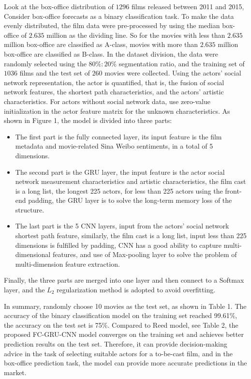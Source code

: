 \documentclass[review]{cvpr}
\begin{document}
Look at the box-office distribution of $1296$ films released between 2011 and 2015,
Consider box-office forecasts as a binary classification task.
To make the data evenly distributed, the film data were pre-processed by using the median box-office of $2.635$ million as the dividing line.
So for the movies with  less than $2.635$ million box-office are classified as A-class, movies with more than $2.635$ million box-office are classified as B-class.
In the dataset division, the data were randomly selected using the $80\%:20\%$ segmentation ratio, and the training set of $1036$ films and the test set of $260$ movies were collected.
Using the actors' social network representation, the actor is quantified, that is,
the fusion of social network features, the shortest path characteristics, and the actors' artistic characteristics.
For actors without social network data, use zero-value initialization in the actor feature matrix for the unknown characteristics.
As shown in Figure 1, the model is divided into three parts:

\begin{itemize}
\item The first part is the fully connected layer, its input feature is the film metadata and movie-related Sina Weibo sentiments, in a total of 5 dimensions.
\item The second part is the GRU layer, the input feature is the actor social network measurement characteristics and artistic characteristics, the film cast is a long list,
the longest 225 actors, for less than 225 actors using the front-end padding, the GRU layer is to solve the long-term memory loss of the structure.
\item The last part is the 5 CNN layers, input from the actors' social network shortest path feature, similarly, the film cast is a long list,
input less than 225 dimensions is fulfilled by padding, CNN has a good ability to capture multi-dimensional features, and use of Max-pooling layer to solve the problem of multi-dimension feature extraction.
\end{itemize}
Finally, the three parts are merged into one layer and then connect to a Softmax layer, and the $L_2$ regularization method is adopted to avoid overfitting.


In summary, randomly choose 10 movies as the test set, as shown in Table 1.
The accuracy of the binary classification model on the training set reached 99.61\%, the accuracy on the test set is 75\%.
Compared to Reed \etal model, see Table 2, the proposed FC-GRU-CNN model converges on the training set and achieves better prediction results on the test set.
Therefore, it can provide decision-making advice in the task of selecting suitable actors for a to-be-cast film,
and in the box-office prediction task, the model can provide more accurate predictions in the market.
\end{document}
